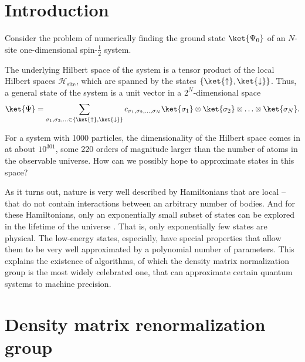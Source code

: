 

\section{Introduction}
Consider the problem of numerically finding the ground state $\ket{\Psi_0}$ of an
$N$-site one-dimensional spin-$\frac{1}{2}$ system.

The underlying Hilbert space of the system is a tensor product of the
local Hilbert spaces $\mathcal{H}_{\text{site}}$, which are spanned by the
states $\{\ket{\uparrow}, \ket{\downarrow}\}$. Thus, a general state of the system is a unit vector in
a $2^N$-dimensional space
\begin{equation}
  \ket{\Psi} = \sum_{\sigma_1, \sigma_2, \ldots \in \{\ket{\uparrow}, \ket{\downarrow}\}}
  c_{\sigma_1, \sigma_2, \ldots, \sigma_N} \ket{\sigma_1} \otimes \ket{\sigma_2} \otimes
  \ldots \otimes \ket{\sigma_N}.
\end{equation}

For a system with 1000 particles, the dimensionality of the Hilbert
space comes in at about $10^{301}$, some 220 orders of magnitude larger than the number of
atoms in the observable universe. How can we possibly hope to approximate states in this
space?

As it turns out, nature is very well described by Hamiltonians that are local -- that do
not contain interactions between an arbitrary number of bodies. And for these
Hamiltonians, only an exponentially small subset of states can be explored in the lifetime
of the universe \cite{poulin2011quantum}. That is, only exponentially few states are
physical. The low-energy states, especially, have special properties that allow them to be
very well approximated by a polynomial number of parameters. This explains the existence
of algorithms, of which the density matrix normalization group is the most widely
celebrated one, that can approximate certain quantum systems to machine precision.


\section{Density matrix renormalization group}

